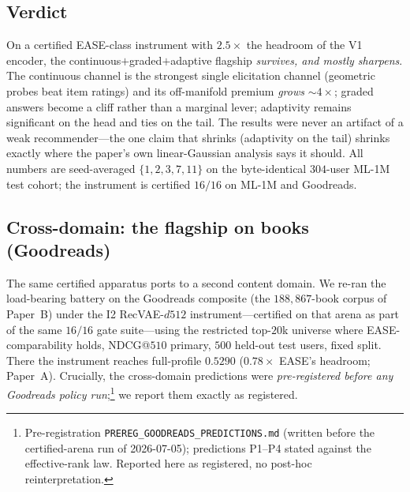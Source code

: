 \documentclass[11pt]{article}
\begin{document}
\subsection{Verdict}\label{sec:i2verdict}
On a certified EASE-class instrument with $2.5\times$ the headroom of the V1 encoder, the continuous$+$graded$+$adaptive
flagship \emph{survives, and mostly sharpens}. The continuous channel is the strongest single elicitation channel
(geometric probes beat item ratings) and its off-manifold premium \emph{grows} $\sim4\times$; graded answers become a
cliff rather than a marginal lever; adaptivity remains significant on the head and ties on the tail. The results were
never an artifact of a weak recommender---the one claim that shrinks (adaptivity on the tail) shrinks exactly where the
paper's own linear-Gaussian analysis says it should. All numbers are seed-averaged $\{1,2,3,7,11\}$ on the byte-identical
$304$-user ML-1M test cohort; the instrument is certified $16/16$ on ML-1M and Goodreads.

\subsection{Cross-domain: the flagship on books (Goodreads)}\label{sec:i2gr}
The same certified apparatus ports to a second content domain. We re-ran the load-bearing battery on the Goodreads
composite (the $188{,}867$-book corpus of Paper~B) under the I2 RecVAE-$d512$ instrument---certified on that arena as
part of the same $16/16$ gate suite---using the restricted top-$20$k universe where EASE-comparability holds, NDCG@$510$
primary, $500$ held-out test users, fixed split. There the instrument reaches full-profile $0.5290$ ($0.78\times$
EASE's headroom; Paper~A). Crucially, the cross-domain predictions were \emph{pre-registered before any Goodreads
policy run};\footnote{Pre-registration \texttt{PREREG\_GOODREADS\_PREDICTIONS.md} (written before the certified-arena
run of 2026-07-05); predictions P1--P4 stated against the effective-rank law. Reported here as registered, no post-hoc
reinterpretation.} we report them exactly as registered.
\end{document}

